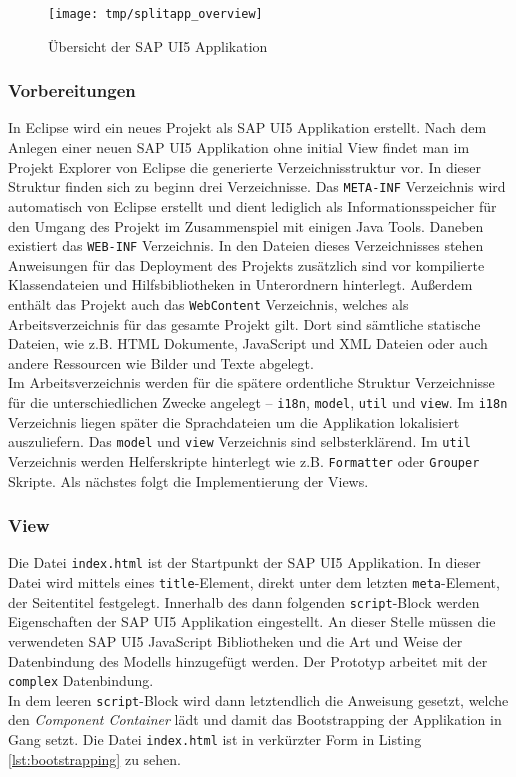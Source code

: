 \vspace{1em}
\begin{figure}[htb]
  \centering
  \texttt{[image: tmp/splitapp\_overview]}
  \caption[Übersicht der SAP UI5 Applikation]{Übersicht der SAP UI5 Applikation \cite{SAPSplitApp}}
  \label{fig:splitappoverview}
\end{figure}

\subsubsection{Vorbereitungen}
In Eclipse wird ein neues Projekt als SAP UI5 Applikation erstellt. Nach dem Anlegen einer neuen SAP UI5 Applikation ohne initial View findet man im Projekt Explorer von Eclipse die generierte Verzeichnisstruktur vor. In dieser Struktur finden sich zu beginn drei Verzeichnisse. Das \texttt{META-INF} Verzeichnis wird automatisch von Eclipse erstellt und dient lediglich als Informationsspeicher für den Umgang des Projekt im Zusammenspiel mit einigen Java Tools. Daneben existiert das \texttt{WEB-INF} Verzeichnis. In den Dateien dieses Verzeichnisses stehen Anweisungen für das Deployment des Projekts zusätzlich sind vor kompilierte Klassendateien und Hilfsbibliotheken in Unterordnern hinterlegt. Außerdem enthält das Projekt auch das \texttt{WebContent} Verzeichnis, welches als Arbeitsverzeichnis für das gesamte Projekt gilt. Dort sind sämtliche statische Dateien, wie z.B. HTML Dokumente, JavaScript und XML Dateien oder auch andere Ressourcen wie Bilder und Texte abgelegt.\\Im Arbeitsverzeichnis werden für die spätere ordentliche Struktur Verzeichnisse für die unterschiedlichen Zwecke angelegt -- \texttt{i18n}, \texttt{model}, \texttt{util} und \texttt{view}. Im \texttt{i18n} Verzeichnis liegen später die Sprachdateien um die Applikation lokalisiert auszuliefern. Das \texttt{model} und \texttt{view} Verzeichnis sind selbsterklärend. Im \texttt{util} Verzeichnis werden Helferskripte hinterlegt wie z.B. \texttt{Formatter} oder \texttt{Grouper} Skripte. Als nächstes folgt die Implementierung der Views.

\subsubsection{View}
Die Datei \texttt{index.html} ist der Startpunkt der SAP UI5 Applikation. In dieser Datei wird mittels eines \texttt{title}-Element, direkt unter dem letzten \texttt{meta}-Element, der Seitentitel festgelegt. Innerhalb des dann folgenden \texttt{script}-Block werden Eigenschaften der SAP UI5 Applikation eingestellt. An dieser Stelle müssen die verwendeten SAP UI5 JavaScript Bibliotheken und die Art und Weise der Datenbindung des Modells hinzugefügt werden. Der Prototyp arbeitet mit der \texttt{complex} Datenbindung.\\In dem leeren \texttt{script}-Block wird dann letztendlich die Anweisung gesetzt, welche den \textit{Component Container} lädt und damit das Bootstrapping der Applikation in Gang setzt. Die Datei \texttt{index.html} ist in verkürzter Form in Listing \ref{lst:bootstrapping} zu sehen.
	
